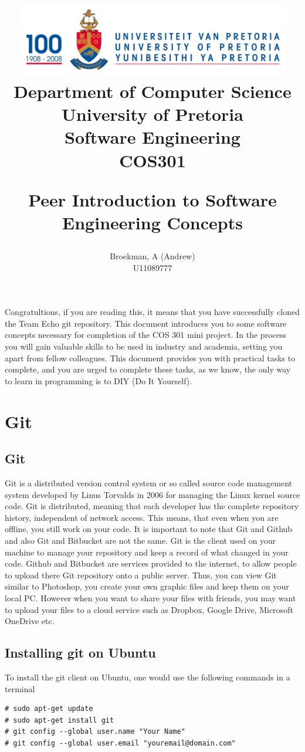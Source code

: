 \documentclass[a4paper,10pt]{article}
\title{\includegraphics[width=12cm]{Eeufeeslogo.jpg} \\
       Department of Computer Science \\
       University of Pretoria \\
       \vspace{0.5cm}
       Software Engineering\\
       COS301 \\
       \vspace{0.5cm}
       \begin{large}Peer Introduction to Software Engineering Concepts\end{large}
}
\date{}
\author{Broekman, A (Andrew) \\
U11089777}
\begin{document}
\maketitle

Congratultions, if you are reading this, it means that you have successfully cloned the Team Echo git repository. This document introduces you to some software concepts necessary for completion of the COS 301 mini project. In the process you will gain valuable skills to be used in industry and academia, setting you apart from fellow colleagues. This document provides you with practical tasks to complete, and you are urged to complete these tasks, as we know, the only way to learn in programming is to DIY (Do It Yourself). 

\section{Git}
\subsection{Git}

Git is a distributed version control system or so called source code management system developed by Linus Torvalds in 2006 for managing the Linux kernel source code. Git is distributed, meaning that each developer has the complete repository history, independent of network access. This means, that even when you are offline, you still work on your code. It is important to note that Git and Github and also Git and Bitbucket are not the same. Git is the client used on your machine to manage your repository and keep a record of what changed in your code. Github and Bitbucket are services provided to the internet, to allow people to upload there Git repository onto a public server. Thus, you can view Git similar to Photoshop, you create your own graphic files and keep them on your local PC. However when you want to share your files with friends, you may want to upload your files to a cloud service such as Dropbox, Google Drive, Microsoft OneDrive etc.

\subsection{Installing git on Ubuntu}

To install the git client on Ubuntu, one would use the following commands in a terminal \\
\begin{lstlisting}[style=TerminalStyle]
# sudo apt-get update
# sudo apt-get install git
# git config --global user.name "Your Name"
# git config --global user.email "youremail@domain.com"
\end{lstlisting}
\end{document}
